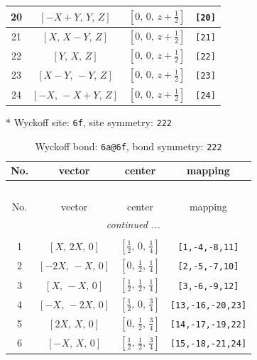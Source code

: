 \documentclass[fleqn,8pt]{jsarticle}
\begin{document}
\begin{longtable}{cccc}
20 & $\left[ - X + Y,\, Y,\, Z \right]$ & $\left[ 0,\, 0,\, z + \frac{1}{2} \right]$ & {\tt [20]} \\ \hline
21 & $\left[ X,\, X - Y,\, Z \right]$ & $\left[ 0,\, 0,\, z + \frac{1}{2} \right]$ & {\tt [21]} \\ \hline
22 & $\left[ Y,\, X,\, Z \right]$ & $\left[ 0,\, 0,\, z + \frac{1}{2} \right]$ & {\tt [22]} \\ \hline
23 & $\left[ X - Y,\, - Y,\, Z \right]$ & $\left[ 0,\, 0,\, z + \frac{1}{2} \right]$ & {\tt [23]} \\ \hline
24 & $\left[ - X,\, - X + Y,\, Z \right]$ & $\left[ 0,\, 0,\, z + \frac{1}{2} \right]$ & {\tt [24]} \\
\end{longtable}
* Wyckoff site: {\tt 6f}, site symmetry: {\tt 222}
\renewcommand{\arraystretch}{1.2}
\begin{longtable}{cccc}
\caption{Wyckoff bond: {\tt 6a@6f}, bond symmetry: {\tt 222}}
 \\
 \hline \hline
No. & vector & center & mapping \\ \hline \endfirsthead

\multicolumn{3}{l}{\tablename\ \thetable{}} \\
 \hline \hline
No. & vector & center & mapping \\ \hline \endhead

 \hline \hline
\multicolumn{3}{r}{\footnotesize\it continued ...} \\ \endfoot

 \hline \hline
\multicolumn{3}{r}{} \\ \endlastfoot

1 & $\left[ X,\, 2 X,\, 0 \right]$ & $\left[ \frac{1}{2},\, 0,\, \frac{1}{4} \right]$ & {\tt [1,-4,-8,11]} \\ \hline
2 & $\left[ - 2 X,\, - X,\, 0 \right]$ & $\left[ 0,\, \frac{1}{2},\, \frac{1}{4} \right]$ & {\tt [2,-5,-7,10]} \\ \hline
3 & $\left[ X,\, - X,\, 0 \right]$ & $\left[ \frac{1}{2},\, \frac{1}{2},\, \frac{1}{4} \right]$ & {\tt [3,-6,-9,12]} \\ \hline
4 & $\left[ - X,\, - 2 X,\, 0 \right]$ & $\left[ \frac{1}{2},\, 0,\, \frac{3}{4} \right]$ & {\tt [13,-16,-20,23]} \\ \hline
5 & $\left[ 2 X,\, X,\, 0 \right]$ & $\left[ 0,\, \frac{1}{2},\, \frac{3}{4} \right]$ & {\tt [14,-17,-19,22]} \\ \hline
6 & $\left[ - X,\, X,\, 0 \right]$ & $\left[ \frac{1}{2},\, \frac{1}{2},\, \frac{3}{4} \right]$ & {\tt [15,-18,-21,24]} \\
\end{longtable}
\end{document}
